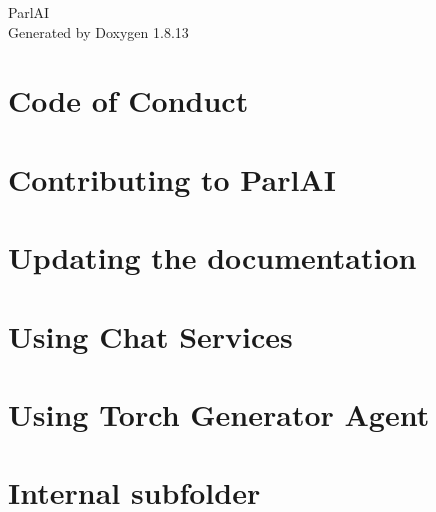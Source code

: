 \documentclass[twoside]{book}
\newcommand{\+}{\discretionary{\mbox{\scriptsize$\hookleftarrow$}}{}{}}
\newcommand{\clearemptydoublepage}{%
  \newpage{\pagestyle{empty}\cleardoublepage}%
}
\begin{document}
\hypersetup{pageanchor=false,
             bookmarksnumbered=true,
             pdfencoding=unicode
            }
\begin{titlepage}
\vspace*{7cm}
\begin{center}%
{\Large Parl\+AI }\\
\vspace*{1cm}
{\large Generated by Doxygen 1.8.13}\\
\end{center}
\end{titlepage}
\clearemptydoublepage
{}
\tableofcontents
\clearemptydoublepage
{}
\hypersetup{pageanchor=true}

\chapter{Code of Conduct}
\label{md_CODE_OF_CONDUCT}

\chapter{Contributing to Parl\+AI}
\label{md_CONTRIBUTING}

\chapter{Updating the documentation}
\label{md_docs_README}

\chapter{Using Chat Services}
\label{md_docs_source_tutorial_chat_service}

\chapter{Using Torch Generator Agent}
\label{md_docs_source_tutorial_torch_generator_agent}

\chapter{Internal subfolder}
\label{md_example_parlai_internal_README}

\end{document}
